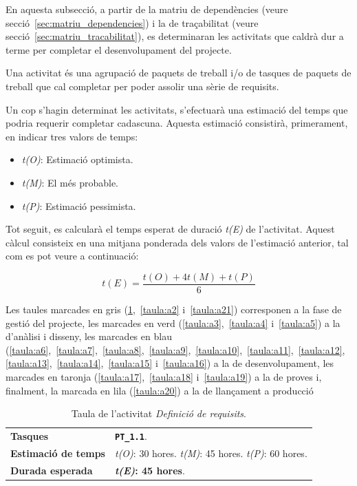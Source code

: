 \documentclass[a4paper,12pt]{ThesisStyle}
\begin{document}
En aquesta subsecció, a partir de la matriu de dependències (veure secció~\ref{sec:matriu_dependencies}) i la de traçabilitat (veure secció~\ref{sec:matriu_tracabilitat}), es determinaran les activitats que caldrà dur a terme per completar el desenvolupament del projecte.

Una activitat és una agrupació de paquets de treball i/o de tasques de paquets de treball que cal completar per poder assolir una sèrie de requisits.

Un cop s'hagin determinat les activitats, s'efectuarà una estimació del temps que podria requerir completar cadascuna. Aquesta estimació consistirà, primerament, en indicar tres valors de temps:

\begin{itemize}
  \item \textit{t(O)}: Estimació optimista.
  \item \textit{t(M)}: El més probable.
  \item \textit{t(P)}: Estimació pessimista.
\end{itemize}

Tot seguit, es calcularà el temps esperat de duració \textit{t(E)} de l'activitat. Aquest càlcul consisteix en una mitjana ponderada dels valors de l'estimació anterior, tal com es pot veure a continuació:

\begin{equation*}
  t(E) = \frac{t(O) + 4t(M) + t(P)}{6}
\end{equation*}

Les taules marcades en gris (\ref{taula:a1},~\ref{taula:a2} i~\ref{taula:a21}) corresponen a la fase de gestió del projecte, les marcades en verd (\ref{taula:a3},~\ref{taula:a4} i~\ref{taula:a5}) a la d'anàlisi i disseny, les marcades en blau (\ref{taula:a6},~\ref{taula:a7},~\ref{taula:a8},~\ref{taula:a9},~\ref{taula:a10},~\ref{taula:a11},~\ref{taula:a12},~\ref{taula:a13},~\ref{taula:a14},~\ref{taula:a15} i~\ref{taula:a16}) a la de desenvolupament, les marcades en taronja (\ref{taula:a17},~\ref{taula:a18} i~\ref{taula:a19}) a la de proves i, finalment, la marcada en lila (\ref{taula:a20}) a la de llançament a producció

\begin{table}[H]
  \begin{tabularx}{\textwidth}{l | X}
    \toprule
    \rowcolor{Gray}
    \multicolumn{2}{c}{\texttt{\textbf{A1:}} Definició de requisits}\\
    \midrule[0.9pt]
    \textbf{Tasques}                 & \texttt{\textbf{PT\_1.1}}.\\
    \midrule
    \textbf{Estimació de temps}      & \textit{t(O)}: 30 hores.
    \newline \textit{t(M)}: 45 hores.
    \newline \textit{t(P)}: 60 hores.\\
    \midrule
    \textbf{Durada esperada}         & \textbf{\textit{t(E)}: 45 hores}.\\
    \bottomrule
  \end{tabularx}
  \caption{\label{taula:a1} Taula de l'activitat \emph{Definició de requisits}.}
\end{table}
\end{document}
